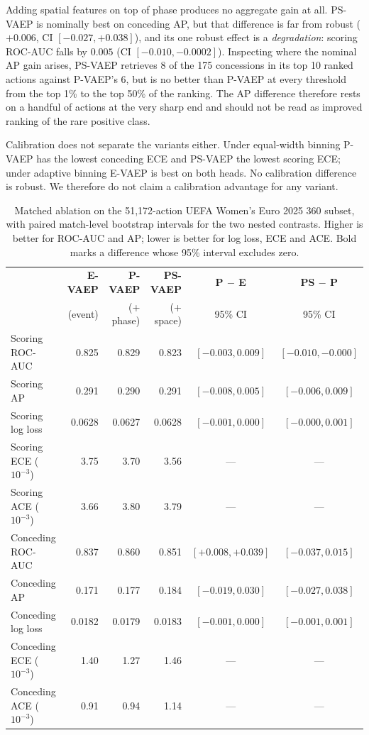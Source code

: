 \documentclass[runningheads]{llncs}
\begin{document}
Adding spatial features on top of phase produces no aggregate gain at all. PS-VAEP is nominally best on conceding AP, but that difference is far from robust ($+0.006$, CI $[-0.027, +0.038]$), and its one robust effect is a \emph{degradation}: scoring ROC-AUC falls by $0.005$ (CI $[-0.010, -0.0002]$). Inspecting where the nominal AP gain arises, PS-VAEP retrieves 8 of the 175 concessions in its top 10 ranked actions against P-VAEP's 6, but is no better than P-VAEP at every threshold from the top 1\% to the top 50\% of the ranking. The AP difference therefore rests on a handful of actions at the very sharp end and should not be read as improved ranking of the rare positive class.

Calibration does not separate the variants either. Under equal-width binning P-VAEP has the lowest conceding ECE and PS-VAEP the lowest scoring ECE; under adaptive binning E-VAEP is best on both heads. No calibration difference is robust. We therefore do not claim a calibration advantage for any variant.
\begin{table}[tbp]
\footnotesize
\centering
\caption{Matched ablation on the 51{,}172-action UEFA Women's Euro 2025 360 subset, with paired match-level bootstrap intervals for the two nested contrasts. Higher is better for ROC-AUC and AP; lower is better for log loss, ECE and ACE. Bold marks a difference whose 95\% interval excludes zero.}
\label{tab:ablation}
\begin{tabular}{lrrrcc}
\toprule
& \textbf{E-VAEP} & \textbf{P-VAEP} & \textbf{PS-VAEP}
& \textbf{P $-$ E} & \textbf{PS $-$ P} \\
& (event) & (+ phase) & (+ space) & 95\% CI & 95\% CI \\
\midrule
Scoring ROC-AUC & 0.825 & 0.829 & 0.823
& $[-0.003, 0.009]$ & $\mathbf{[-0.010, -0.000]}$ \\
Scoring AP & 0.291 & 0.290 & 0.291
& $[-0.008, 0.005]$ & $[-0.006, 0.009]$ \\
Scoring log loss & 0.0628 & 0.0627 & 0.0628
& $[-0.001, 0.000]$ & $[-0.000, 0.001]$ \\
Scoring ECE ($10^{-3}$) & 3.75 & 3.70 & 3.56 & --- & --- \\
Scoring ACE ($10^{-3}$) & 3.66 & 3.80 & 3.79 & --- & --- \\
\midrule
Conceding ROC-AUC & 0.837 & 0.860 & 0.851
& $\mathbf{[+0.008, +0.039]}$ & $[-0.037, 0.015]$ \\
Conceding AP & 0.171 & 0.177 & 0.184
& $[-0.019, 0.030]$ & $[-0.027, 0.038]$ \\
Conceding log loss & 0.0182 & 0.0179 & 0.0183
& $[-0.001, 0.000]$ & $[-0.001, 0.001]$ \\
Conceding ECE ($10^{-3}$) & 1.40 & 1.27 & 1.46 & --- & --- \\
Conceding ACE ($10^{-3}$) & 0.91 & 0.94 & 1.14 & --- & --- \\
\bottomrule
\end{tabular}
\end{table}
\end{document}
